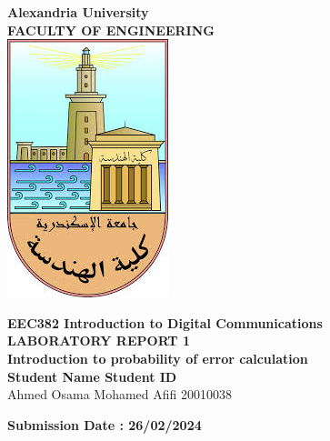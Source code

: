 \documentclass[a4paper, 12pt, english]{article}
\begin{document}
\begin{titlepage}
\begin{center}
\textbf{\LARGE Alexandria University}\\[0.5cm] 
\textbf{\large FACULTY OF ENGINEERING}\\[0.2cm]
\vspace{20pt}
\includegraphics{logo.png}\\[1cm]
\par
\vspace{20pt}
\textbf{\Large EEC382 Introduction to Digital Communications}\\
\vspace{15pt}
\myrule[1pt][7pt]
\textbf{\LARGE  LABORATORY REPORT 1}\\
\vspace{15pt}
\textbf{\large Introduction to probability of error calculation}\\
\myrule[1pt][7pt]
\vspace{25pt}
\textbf{\large \hspace{50pt}Student Name \hspace{60pt} Student ID}\\
Ahmed Osama Mohamed Afifi \hspace{60pt} 20010038 \\

\vspace{45pt}
\end{center}

\par
\vfill
\begin{center}
\textbf{Submission Date : 26/02/2024}\\
\end{center}

\end{titlepage}
\end{document}
